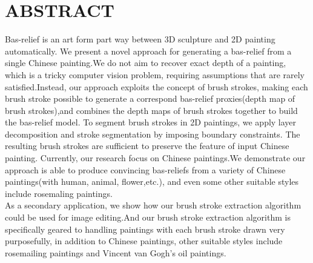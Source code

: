 \section*{\centering ABSTRACT}
Bas-relief is an art form part way between 3D sculpture and 2D painting automatically. We present a novel approach for generating a bas-relief from a single Chinese painting.We do not aim to recover exact depth of a painting, which is a tricky computer vision problem, requiring assumptions that are rarely satisfied.Instead, our approach exploits the concept of brush strokes, making each brush stroke possible to generate a correspond bas-relief proxies(depth map of brush strokes),and combines the depth maps of brush strokes together to build the bas-relief model. To segment brush strokes in 2D paintings, we apply layer decomposition and stroke segmentation by imposing boundary constraints. The resulting brush strokes are sufficient to preserve the feature of input Chinese painting. Currently, our research focus on Chinese paintings.We demonstrate our approach is able to produce convincing bas-reliefs from a variety of Chinese paintings(with human, animal, flower,etc.), and even some other suitable styles include rosemaling paintings. \\
As a secondary application, we show how our brush stroke extraction algorithm could be used for image editing.And our brush stroke extraction algorithm is specifically geared to handling paintings with each brush stroke drawn very purposefully, in addition to Chinese paintings, other suitable styles include rosemailing paintings and Vincent van Gogh's oil paintings.

\newpage


 

